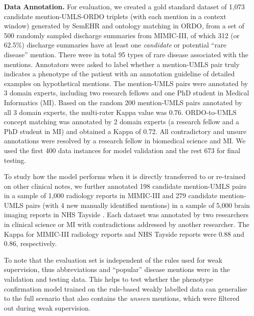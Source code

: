 \documentclass[twocolumn]{bmcart}
\begin{document}
\textbf{Data Annotation.} For evaluation, we created a gold standard dataset of 1,073 candidate mention-UMLS-ORDO triplets (with each mention in a context window) generated by SemEHR and ontology matching in ORDO, from a set of 500 randomly sampled discharge summaries from MIMIC-III, of which 312 (or 62.5\%) discharge summaries have at least one \textit{candidate} or potential ``rare disease'' mention. There were in total 95 types of rare disease associated with the mentions. Annotators were asked to label whether a mention-UMLS pair truly indicates a phenotype of the patient with an annotation guideline of detailed examples on hypothetical mentions. The mention-UMLS pairs were annotated by 3 domain experts, including two research fellows and one PhD student in Medical Informatics (MI). Based on the random 200 mention-UMLS pairs annotated by all 3 domain experts, the multi-rater Kappa value was 0.76. ORDO-to-UMLS concept matching was annotated by 2 domain experts (a research fellow and a PhD student in MI) and obtained a Kappa of 0.72. All contradictory and unsure annotations were resolved by a research fellow in biomedical science and MI. We used the first 400 data instances for model validation and the rest 673 for final testing.

To study how the model performs when it is directly transferred to or re-trained on other clinical notes, we further annotated 198 candidate mention-UMLS pairs in a sample of 1,000 radiology reports in MIMIC-III \cite{johnson_mimic-iii_2016} and 279 candidate mention-UMLS pairs (with 4 new manually identified mentions) in a sample of 5,000 brain imaging reports in NHS Tayside \cite{gorinski_named_2019}. Each dataset was annotated by two researchers in clinical science or MI with contradictions addressed by another researcher. The Kappa for MIMIC-III radiology reports and NHS Tayside reports were 0.88 and 0.86, respectively. 

To note that the evaluation set is independent of the rules used for weak supervision, thus abbreviations and ``popular'' disease mentions were in the validation and testing data. This helps to test whether the phenotype confirmation model trained on the rule-based weakly labelled data can generalise to the full scenario that also contains the \textit{unseen} mentions, which were filtered out during weak supervision.
\end{document}
